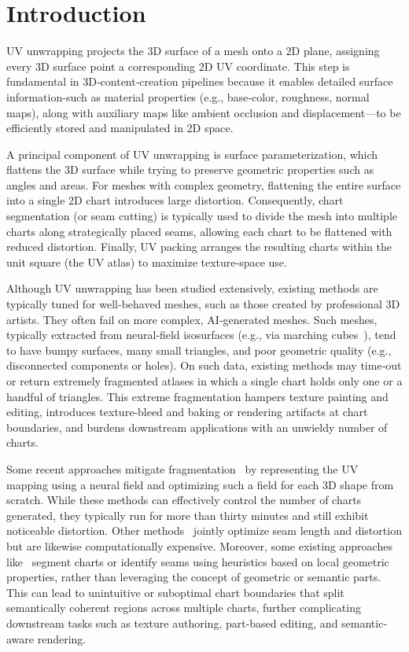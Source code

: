 \section{Introduction}
UV unwrapping projects the 3D surface of a mesh onto a 2D plane, assigning every 3D surface point a corresponding 2D UV coordinate. This step is fundamental in 3D‑content‑creation pipelines because it enables detailed surface information-such as material properties (e.g., base‑color, roughness, normal maps), along with auxiliary maps like ambient occlusion and displacement—to be efficiently stored and manipulated in 2D space.

A principal component of UV unwrapping is surface parameterization, which flattens the 3D surface while trying to preserve geometric properties such as angles and areas. For meshes with complex geometry, flattening the entire surface into a single 2D chart introduces large distortion. Consequently, chart segmentation (or seam cutting) is typically used to divide the mesh into multiple charts along strategically placed seams, allowing each chart to be flattened with reduced distortion. Finally, UV packing arranges the resulting charts within the unit square (the UV atlas) to maximize texture‑space use.

Although UV unwrapping has been studied extensively, existing methods are typically tuned for well-behaved meshes, such as those created by professional 3D artists. They often fail on more complex, AI‑generated meshes. Such meshes, typically extracted from neural‑field isosurfaces (e.g., via marching cubes~\cite{lorensen1998marching}), tend to have bumpy surfaces, many small triangles, and poor geometric quality (e.g., disconnected components or holes). On such data, existing methods may time‑out or return extremely fragmented atlases in which a single chart holds only one or a handful of triangles. This extreme fragmentation hampers texture painting and editing, introduces texture‑bleed and baking or rendering artifacts at chart boundaries, and burdens downstream applications with an unwieldy number of charts.

Some recent approaches mitigate fragmentation~\cite{srinivasan2024nuvo,zhang2024flatten,zhao2025flexpara} by representing the UV mapping using a neural field and optimizing such a field for each 3D shape from scratch. While these methods can effectively control the number of charts generated, they typically run for more than thirty minutes and still exhibit noticeable distortion. Other methods~\cite{li2018optcuts, autoCuts} jointly optimize seam length and distortion but are likewise computationally expensive. Moreover, some existing approaches like~\cite{sorkine2002bounded,lscm, zhou2004iso} segment charts or identify seams using heuristics based on local geometric properties, rather than leveraging the concept of geometric or semantic parts. This can lead to unintuitive or suboptimal chart boundaries that split semantically coherent regions across multiple charts, further complicating downstream tasks such as texture authoring, part-based editing, and semantic-aware rendering.

